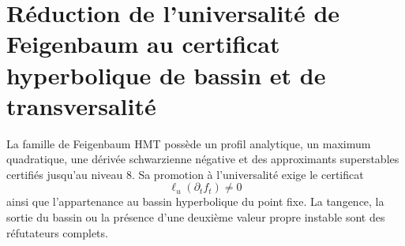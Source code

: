 \section{Réduction de l’universalité de Feigenbaum au certificat hyperbolique de bassin et de transversalité}
\label{sec:p3-final:cierre-feigenbaum}

La famille de Feigenbaum HMT possède un profil analytique, un maximum quadratique,
une dérivée schwarzienne négative et des approximants superstables certifiés jusqu’au niveau
\(8\). Sa promotion à l’universalité exige le certificat
\[
 \ell_u(\partial_t f_t)\ne0
\]
ainsi que l’appartenance au bassin hyperbolique du point fixe. La tangence,
la sortie du bassin ou la présence d’une deuxième valeur propre instable sont
des réfutateurs complets.

